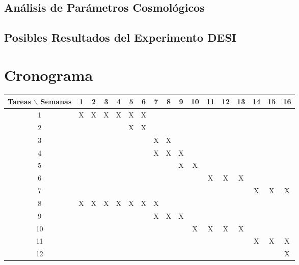 \documentclass[preprint]{aastex62}
\begin{document}
  \subsection{Análisis de Parámetros Cosmológicos}

  \subsection{Posibles Resultados del Experimento DESI}
    

  \section{Cronograma}

  \begin{table}[htb]
    \begin{tabular}{|c|cccccccccccccccc| }
      \hline
      Tareas $\backslash$ Semanas & 1 & 2 & 3 & 4 & 5 & 6 & 7 & 8 & 9 & 10 & 11 & 12 & 13 & 14 & 15 & 16  \\
      \hline
      1 & X & X & X & X & X & X &   &   &   &   &   &   &   &   &   &   \\
      2 &   &   &   &   & X & X &   &   &   &   &   &   &   &   &   &   \\
      3 &   &   &   &   &   &   & X & X &   &   &   &   &   &   &   &   \\
      4 &   &   &   &   &   &   & X & X & X &   &   &   &   &   &   &   \\
      5 &   &   &   &   &   &   &   &   & X & X &   &   &   &   &   &   \\
      6 &   &   &   &   &   &   &   &   &   &   & X & X & X &   &   &   \\
      7 &   &   &   &   &   &   &   &   &   &   &   &   &   & X & X & X \\
      8 & X & X & X & X & X & X & X &   &   &   &   &   &   &   &   &   \\
      9 &   &   &   &   &   &   & X & X & X &   &   &   &   &   &   &   \\
      10&   &   &   &   &   &   &   &   &   & X & X & X & X &   &   &   \\
      11&   &   &   &   &   &   &   &   &   &   &   &   &   & X & X & X \\
      12&   &   &   &   &   &   &   &   &   &   &   &   &   &   &   & X \\
      \hline
    \end{tabular}
  \end{table}
\end{document}
